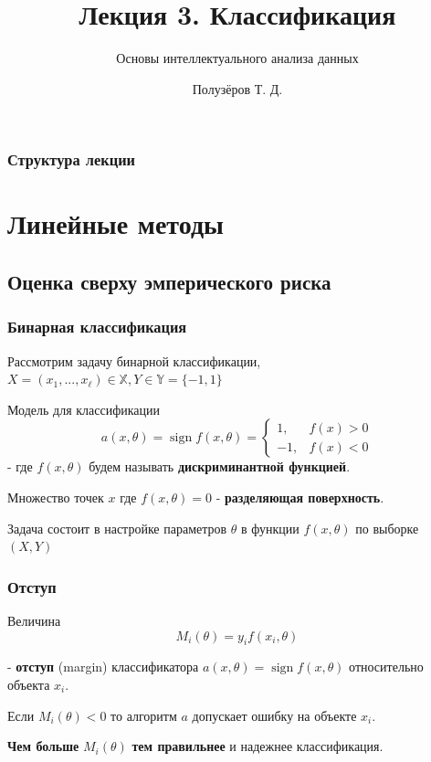 \documentclass{beamer}
\title[Классификация]{Лекция 3. Классификация}
\subtitle{Основы интеллектуального анализа данных}
\author{Полузёров Т. Д.}
\institute{БГУ ФПМИ}
\date{}
\DeclareMathOperator{\sign}{sign}
\begin{document}
	
	\begin{frame}
		\titlepage
	\end{frame}
	
	\begin{center}
		\frametitle{Структура лекции}
		\tableofcontents	
	\end{center}
	
	\section{Линейные методы}
	
	\subsection{Оценка сверху эмперического риска}
	
	\begin{frame}
		\frametitle{Бинарная классификация}
		Рассмотрим задачу бинарной классификации, $X=(x_1, ..., x_{\ell}) \in \mathbb{X}, Y \in \mathbb{Y} = \{-1, 1\}$
		
		\vspace{5pt}
		
		Модель для классификации
		\[
		a(x, \theta) 
		= \sign f(x, \theta)
		=
		\begin{cases}
			1,& f(x) > 0 \\
			-1,& f(x) < 0
		\end{cases}
		\]
		- где $f(x, \theta)$
		будем называть \textbf{дискриминантной функцией}.
		
		\vspace{5pt}
		
		Множество точек $x$ где $f(x, \theta) = 0$ - \textbf{разделяющая поверхность}.
		
		\vspace{5pt}
		
		Задача состоит в настройке параметров $\theta$ в функции $f(x, \theta)$ по выборке $(X, Y)$
	\end{frame} 
	
	\begin{frame}
		\frametitle{Отступ}
		
		Величина 
		\[
		M_i(\theta) = y_i f(x_i, \theta)
		\]
		
		 - \textbf{отступ} (margin) классификатора $a(x, \theta) = \sign f(x, \theta)$ относительно объекта $x_i$.
		
		\vspace{15pt}
		
		Если $M_i(\theta) < 0$ то алгоритм $a$ допускает ошибку на объекте $x_i$. 
		
		\vspace{15pt}
		
		\textbf{Чем больше} $M_i(\theta)$ \textbf{тем правильнее} и надежнее классификация.  
	\end{frame}
	
\end{document}
